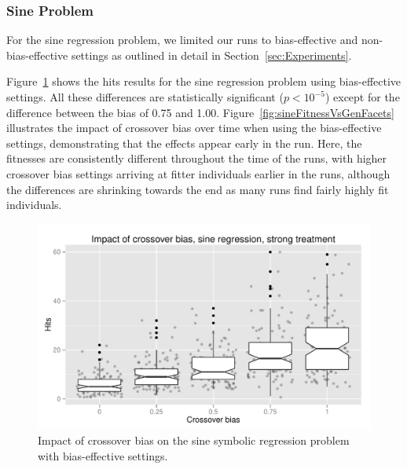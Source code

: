 \documentclass{sig-alternate}
\begin{document}
\subsubsection{Sine Problem}
\label{sec:sineRegression}

For the sine regression problem, we limited our runs to bias-effective and non-bias-effective settings as outlined in
detail in Section~\ref{sec:Experiments}.

Figure~\ref{fig:sineBiasResultsStrong} shows the hits results for the sine regression problem using bias-effective
settings. All these differences are statistically significant ($p < 10^{-5}$) except for the difference between the
bias of 0.75 and 1.00. Figure~\ref{fig:sineFitnessVsGenFacets} illustrates the impact of crossover bias over time
when using the bias-effective settings, demonstrating that the effects appear early in the run. Here, the fitnesses are
consistently different throughout the time of the runs, with higher crossover bias settings arriving at fitter
individuals earlier in the runs, although the differences are shrinking towards the end as many runs find fairly highly
fit individuals.

\begin{figure}
\centering
\includegraphics[width=0.45 \textwidth]{Plots/Sine_XO_impact_strong_boxplot.pdf}
\caption{Impact of crossover bias on the sine symbolic regression problem with bias-effective settings.}
\label{fig:sineBiasResultsStrong}
\end{figure}

%
%
%
%

%
%
%
%
\end{document}
